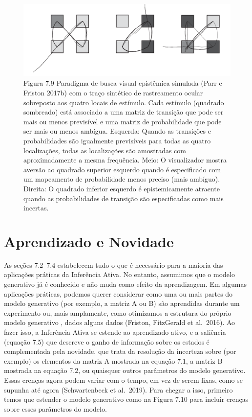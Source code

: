 \documentclass[
  12pt,
]{book}
\begin{document}
\begin{figure}
\centering
\includegraphics{images/Figura_7_9.png}
\caption{Figura 7.9 Paradigma de busca visual epistêmica simulada (Parr e Friston 2017b) com o traço sintético de rastreamento ocular sobreposto aos quatro locais de estímulo. Cada estímulo (quadrado sombreado) está associado a uma matriz de transição que pode ser mais ou menos previsível e uma matriz de probabilidade que pode ser mais ou menos ambígua. Esquerda: Quando as transições e probabilidades são igualmente previsíveis para todas as quatro localizações, todas as localizações são amostradas com aproximadamente a mesma frequência. Meio: O visualizador mostra aversão ao quadrado superior esquerdo quando é especificado com um mapeamento de probabilidade menos preciso (mais ambíguo). Direita: O quadrado inferior esquerdo é epistemicamente atraente quando as probabilidades de transição são especificadas como mais incertas.}
\end{figure}

\hypertarget{aprendizado-e-novidade}{%
\section{Aprendizado e Novidade}\label{aprendizado-e-novidade}}

As seções 7.2--7.4 estabelecem tudo o que é necessário para a maioria das aplicações práticas da Inferência Ativa. No entanto, assumimos que o modelo generativo já é conhecido e não muda como efeito da aprendizagem. Em algumas aplicações práticas, podemos querer considerar como uma ou mais partes do modelo generativo (por exemplo, a matriz A ou B) são aprendidas durante um experimento ou, mais amplamente, como otimizamos a estrutura do próprio modelo generativo , dados alguns dados (Friston, FitzGerald et al.~2016). Ao fazer isso, a Inferência Ativa se estende ao aprendizado ativo, e a saliência (equação 7.5) que descreve o ganho de informação sobre os estados é complementada pela novidade, que trata da resolução da incerteza sobre (por exemplo) os elementos da matriz A mostrada na equação 7.1, a matriz B mostrada na equação 7.2, ou quaisquer outros parâmetros do modelo generativo. Essas crenças agora podem variar com o tempo, em vez de serem fixas, como se supunha até agora (Schwartenbeck et al.~2019). Para chegar a isso, primeiro temos que estender o modelo generativo como na Figura 7.10 para incluir crenças sobre esses parâmetros do modelo.
\end{document}
